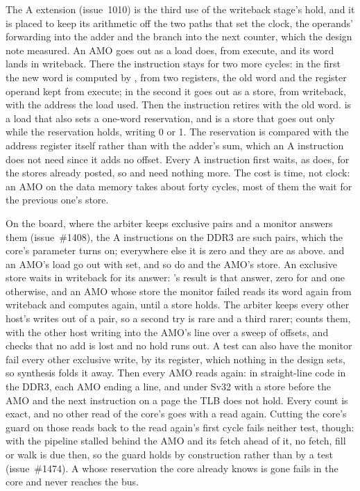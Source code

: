\documentclass[journal,onecolumn,9pt]{IEEEtran}
\begin{document}
The A extension (issue~1010) is the third use of the writeback stage's
hold, and it is placed to keep its arithmetic off the two paths that
set the clock, the operands' forwarding into the adder and the branch
into the next counter, which the design note 
measured. An AMO goes out as a load does, from execute, and its word
lands in writeback. There the instruction stays for two more cycles:
in the first the new word is computed by , from two
registers, the old word and the register operand kept from execute;
in the second it goes out as a store, from writeback, with the
address the load used. Then the instruction retires with the old
word.  is a load that also sets a one-word reservation,
and  is a store that goes out only while the reservation
holds, writing 0 or 1. The reservation is compared with the address
register itself rather than with the adder's sum, which an A
instruction does not need since it adds no offset. Every A
instruction first waits, as  does, for the stores already
posted, so  and  need nothing more. The cost is
time, not clock: an AMO on the data memory takes about forty cycles,
most of them the wait for the previous one's store.

On the board, where the arbiter keeps exclusive pairs and a monitor
answers them (issue~\#1408), the A instructions on the DDR3 are such
pairs, which the core's  parameter turns on; everywhere
else it is zero and they are as above.  and an AMO's load
go out with  set, and so do  and the AMO's store.
An exclusive store waits in writeback for its answer: 's
result is that answer, zero for  and one otherwise, and an
AMO whose store the monitor failed reads its word again from writeback
and computes again, until a store holds. The arbiter keeps every other
host's writes out of a pair, so a second try is rare and a third rarer;
 counts them, with the other host
writing into the AMO's line over a sweep of offsets, and checks that no
add is lost and no hold runs out. A test can also have the monitor fail every
other exclusive write, by its  register, which nothing
in the design sets, so synthesis folds it away. Then every AMO reads
again: in straight-line code in the DDR3, each AMO ending a line, and
under Sv32 with a store before the AMO and the next instruction on a
page the TLB does not hold. Every count is exact, and no other read of
the core's goes with a read again. Cutting the core's guard on those
reads back to the read again's first cycle fails neither test, though:
with the pipeline stalled behind the AMO and its fetch ahead of it, no
fetch, fill or walk is due then, so the guard holds by construction
rather than by a test (issue~\#1474). A  whose reservation the
core already knows is gone fails in the core and never reaches the bus.
\end{document}
